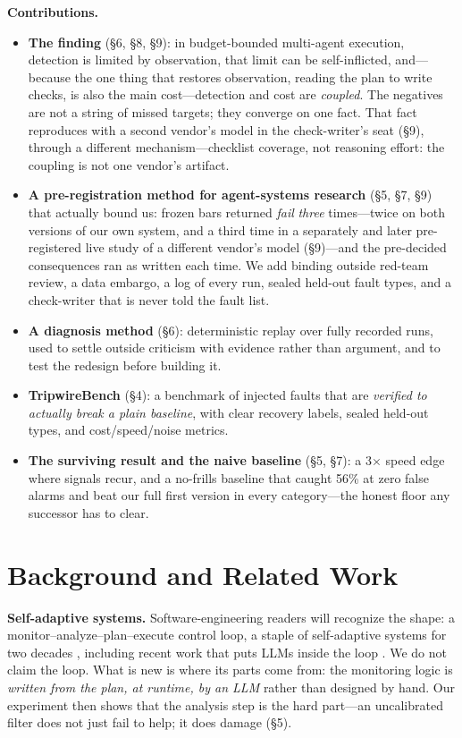 \documentclass[acmsmall,screen]{acmart}
\begin{document}
\textbf{Contributions.}
\begin{itemize}
  \item \textbf{The finding} (\S6, \S8, \S9): in budget-bounded multi-agent
  execution, detection is limited by observation, that limit can be
  self-inflicted, and---because the one thing that restores observation, reading
  the plan to write checks, is also the main cost---detection and cost are
  \emph{coupled}. The negatives are not a string of missed targets; they converge
  on one fact. That fact reproduces with a second vendor's model in the
  check-writer's seat (\S9), through a different mechanism---checklist coverage,
  not reasoning effort: the coupling is not one vendor's artifact.
  \item \textbf{A pre-registration method for agent-systems research} (\S5,
  \S7, \S9) that actually bound us: frozen bars returned \emph{fail} \emph{three}
  times---twice on both versions of our own system, and a third time in a
  separately and later pre-registered live study of a different vendor's model
  (\S9)---and the pre-decided consequences ran as written each time. We add
  binding outside red-team review, a data embargo, a log of every run, sealed
  held-out fault types, and a check-writer that is never told the fault list.
  \item \textbf{A diagnosis method} (\S6): deterministic replay over fully
  recorded runs, used to settle outside criticism with evidence rather than
  argument, and to test the redesign before building it.
  \item \textbf{TripwireBench} (\S4): a benchmark of injected faults that are
  \emph{verified to actually break a plain baseline}, with clear recovery
  labels, sealed held-out types, and cost/speed/noise metrics.
  \item \textbf{The surviving result and the naive baseline} (\S5, \S7): a
  3$\times$ speed edge where signals recur, and a no-frills baseline that
  caught 56\% at zero false alarms and beat our full first version in every
  category---the honest floor any successor has to clear.
\end{itemize}

\section{Background and Related Work}
\textbf{Self-adaptive systems.} Software-engineering readers will recognize the
shape: a monitor--analyze--plan--execute control loop, a staple of
self-adaptive systems for two decades \cite{ref23, ref24}, including recent work
that puts LLMs inside the loop \cite{ref25, ref26}. We do not claim the loop.
What is new is where its parts come from: the monitoring logic is \emph{written
from the plan, at runtime, by an LLM} rather than designed by hand. Our
experiment then shows that the analysis step is the hard part---an uncalibrated
filter does not just fail to help; it does damage (\S5).
\end{document}
